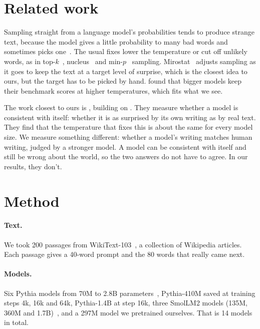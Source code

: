 \documentclass[10pt]{article}
\begin{document}
\section{Related work}

Sampling straight from a language model's probabilities tends to produce strange text, because the model gives a little probability to many bad words and sometimes picks one~\citep{holtzman2020curious}. The usual fixes lower the temperature or cut off unlikely words, as in top-$k$~\citep{fan2018hierarchical}, nucleus~\citep{holtzman2020curious} and min-$p$~\citep{nguyen2024minp} sampling. Mirostat~\citep{basu2021mirostat} adjusts sampling as it goes to keep the text at a target level of surprise, which is the closest idea to ours, but the target has to be picked by hand. \citet{li2025hot} found that bigger models keep their benchmark scores at higher temperatures, which fits what we see.

The work closest to ours is \citet{cao2025entropy}, building on \citet{braverman2020calibration}. They measure whether a model is consistent with itself: whether it is as surprised by its own writing as by real text. They find that the temperature that fixes this is about the same for every model size. We measure something different: whether a model's writing matches human writing, judged by a stronger model. A model can be consistent with itself and still be wrong about the world, so the two answers do not have to agree. In our results, they don't.

\section{Method}

\paragraph{Text.} We took 200 passages from WikiText-103~\citep{merity2016pointer}, a collection of Wikipedia articles. Each passage gives a 40-word prompt and the 80 words that really came next.

\paragraph{Models.} Six Pythia models from 70M to 2.8B parameters~\citep{biderman2023pythia}, Pythia-410M saved at training steps 4k, 16k and 64k, Pythia-1.4B at step 16k, three SmolLM2 models (135M, 360M and 1.7B)~\citep{allal2025smollm2}, and a 297M model we pretrained ourselves. That is 14 models in total.
\end{document}
